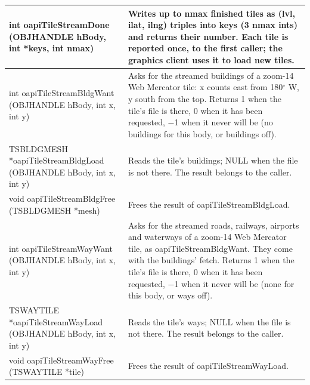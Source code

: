 \documentclass[Orbiter Developer Manual.tex]{subfiles}
\begin{document}
\begin{sloppypar}
\begin{longtable}{ |>{\raggedright\arraybackslash}p{}|p{}| }
	\hline\rule{0pt}{2ex}
	int oapiTileStreamDone (OBJHANDLE hBody, int *keys, int nmax) & Writes up to nmax finished tiles as (lvl, ilat, ilng) triples into keys (3 nmax ints) and returns their number. Each tile is reported once, to the first caller; the graphics client uses it to load new tiles.\\
	\hline\rule{0pt}{2ex}
	int oapiTileStreamBldgWant (OBJHANDLE hBody, int x, int y) & Asks for the streamed buildings of a zoom-14 Web Mercator tile: x counts east from 180$^{\circ}$ W, y south from the top. Returns 1 when the tile's file is there, 0 when it has been requested, $-$1 when it never will be (no buildings for this body, or buildings off).\\
	\hline\rule{0pt}{2ex}
	TSBLDGMESH *oapiTileStreamBldgLoad (OBJHANDLE hBody, int x, int y) & Reads the tile's buildings; NULL when the file is not there. The result belongs to the caller.\\
	\hline\rule{0pt}{2ex}
	void oapiTileStreamBldgFree (TSBLDGMESH *mesh) & Frees the result of oapiTileStreamBldgLoad.\\
	\hline\rule{0pt}{2ex}
	int oapiTileStreamWayWant (OBJHANDLE hBody, int x, int y) & Asks for the streamed roads, railways, airports and waterways of a zoom-14 Web Mercator tile, as oapiTileStreamBldgWant. They come with the buildings' fetch. Returns 1 when the tile's file is there, 0 when it has been requested, $-$1 when it never will be (none for this body, or ways off).\\
	\hline\rule{0pt}{2ex}
	TSWAYTILE *oapiTileStreamWayLoad (OBJHANDLE hBody, int x, int y) & Reads the tile's ways; NULL when the file is not there. The result belongs to the caller.\\
	\hline\rule{0pt}{2ex}
	void oapiTileStreamWayFree (TSWAYTILE *tile) & Frees the result of oapiTileStreamWayLoad.\\
	\hline
	\end{longtable}


\end{sloppypar}
\end{document}
